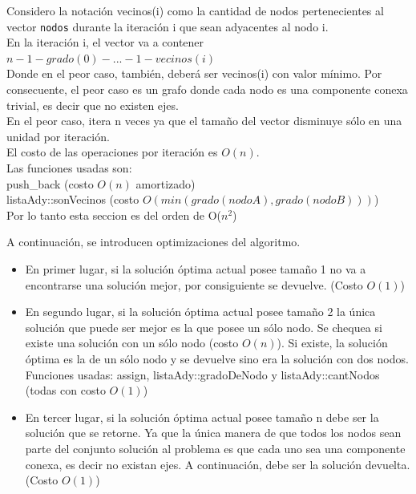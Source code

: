 Considero la notaci\'on vecinos(i) como la cantidad de nodos pertenecientes al vector \texttt{nodos} durante la iteraci\'on i que sean adyacentes al nodo i.\\

En la iteraci\'on i, el vector va a contener $n-1-grado(0)- ... -1-vecinos(i)$\\

Donde en el peor caso, tambi\'en, deber\'a ser vecinos(i) con valor m\'inimo. Por consecuente, el peor caso es un grafo donde cada nodo es una componente conexa trivial, es decir que no existen ejes.\\
	
En el peor caso, itera n veces ya que el tama\~no del vector disminuye s\'olo en una unidad por iteraci\'on.\\

El costo de las operaciones por iteraci\'on es $O(n)$.\\

Las funciones usadas son:\\

push_back (costo $O(n)$ amortizado)\\

listaAdy::sonVecinos (costo $O(min(grado(nodoA), grado(nodoB)))$)\\

Por lo tanto esta seccion es del orden de O($n^2$)

\bigskip

A continuaci\'on, se introducen optimizaciones del algoritmo.

\begin{itemize}
\item En primer lugar, si la soluci\'on \'optima actual posee tama\~no 1 no va a encontrarse una soluci\'on mejor, por consiguiente se devuelve. (Costo $O(1)$)
\item En segundo lugar, si la soluci\'on \'optima actual posee tama\~no 2 la \'unica soluci\'on que puede ser mejor es la que posee un s\'olo nodo. Se chequea si existe una soluci\'on con un s\'olo nodo (costo $O(n)$). Si existe, la soluci\'on \'optima es la de un s\'olo nodo y se devuelve sino era la soluci\'on con dos nodos. Funciones usadas: assign, listaAdy::gradoDeNodo y listaAdy::cantNodos (todas con costo $O(1)$)
\item En tercer lugar, si la soluci\'on \'optima actual posee tama\~no n debe ser la soluci\'on que se retorne. Ya que la \'unica manera de que todos los nodos sean parte del conjunto soluci\'on al problema es que cada uno sea una componente conexa, es decir no existan ejes. A continuaci\'on, debe ser la soluci\'on devuelta. (Costo $O(1)$)
\end{itemize}

